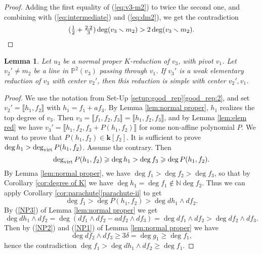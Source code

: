 \documentclass[reqno,oneside,11pt]{amsart}
\theoremstyle{plain}
\newtheorem{lemma}[theorem]{Lemma}
\theoremstyle{definition}
\newcommand{\N}{\mathbb{N}}
\newcommand{\p}{\mathbb{P}}
\newcommand{\K}{\mathbf{k}}
\newcommand{\dvirt}{\deg_{\text{\rm virt}}}
\newcommand{\llb}{\llbracket}
\newcommand{\rrb}{\rrbracket}
\newcommand{\lines}[1]{\p^2(#1)}
\renewcommand{\ge}{\geqslant}
\begin{document}
\begin{proof}
Adding the first equality of (\ref{eq:v3-m2}) to twice the second one, and combining with (\ref{eq:intermediate}) and (\ref{eq:dm2}),  we get
the contradiction
\begin{equation*}
(\tfrac12 + \tfrac{2.2}3) \deg(v_3 \smallsetminus m_2) > 2\deg(v_3 \smallsetminus
m_2).\qedhere
\end{equation*}
\end{proof}


\begin{lemma} \label{lem:=lemme15}
Let $u_3$ be a normal proper $K$-reduction of $v_3$, with pivot $v_1$.
Let $v_2' \neq m_2$ be a line in $\lines{v_3}$ passing through $v_1$.
If $v_3'$ is a weak elementary reduction of $v_3$ with center $v_2'$, then this
reduction is simple with center $v_2',v_1$.
\end{lemma}

\begin{proof}
We use the notation from Set-Up \ref{setup:good_rep}\ref{good_rep:2}, and set
$v_2' = \llb h_1,
f_2 \rrb$ with $h_1 = f_1 + a f_3$.
By Lemma \ref{lem:normal proper}, $h_1$ realizes the top degree of $v_3$.
Then $v_3 = \llb f_1, f_2, f_3 \rrb = \llb h_1, f_2, f_3 \rrb$, and by Lemma
\ref{lem:elem red} we have  $v_3' = \llb h_1, f_2, f_3 +P(h_1, f_2)\rrb$ for
some non-affine polynomial $P$.
We want to prove that $P(h_1, f_2) \in \K[f_2]$.
It is sufficient to prove $\deg h_1 > \dvirt P(h_1,f_2)$.
Assume the contrary. Then
$$\dvirt P(h_1,f_2) \ge \deg h_1 > \deg f_3 \ge \deg P(h_1,f_2).$$
By Lemma \ref{lem:normal proper}, we have $\deg f_1 > \deg f_2 > \deg f_3$, so
that by Corollary \ref{cor:degree of K} we have $\deg h_1 = \deg f_1 \not\in
\N\deg f_2$.
Thus we can apply Corollary \ref{cor:parachute}\ref{parachute-ii} to
get
$$\deg f_1 > \deg P(h_1,f_2) > \deg dh_1 \wedge df_2.$$
By (\ref{NP3}) of Lemma \ref{lem:normal proper} we get
$$\deg dh_1 \wedge df_2 = \deg (df_1 \wedge df_2 - adf_2 \wedge df_3)
= \deg df_1 \wedge df_2 > \deg df_2 \wedge df_3.$$
Then by (\ref{NP2}) and (\ref{NP1}) of Lemma \ref{lem:normal proper}
we have
$$\deg df_2 \wedge df_3 \ge 3\delta = \deg g_1 \ge \deg f_1,$$
hence the contradiction $\deg f_1 > \deg dh_1 \wedge df_2 \ge \deg
f_1$.
\end{proof}
\end{document}
